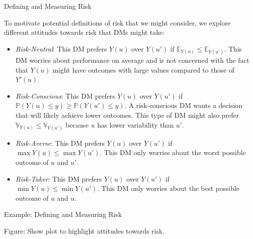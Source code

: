 \documentclass[9pt]{beamer}
\begin{document}
%
\begin{frame}{Defining and Measuring Risk}

To motivate potential definitions of risk that we might consider, we explore different attitudes towards risk that DMs might take: 

\begin{block}{}
\begin{itemize}
\item {\em Risk-Neutral}: This DM prefers $Y(u)$ over $Y(u')$ if $\mathbb{E}_{Y(u)}\leq \mathbb{E}_{Y(u')}$.  This DM worries about performance on average and is not concerned with the fact that $Y(u)$ might have outcomes with large values compared to those of $Y'(u)$. 

\item {\em Risk-Conscious}: This DM prefers $Y(u)$ over $Y(u')$ if $\mathbb{P}(Y(u)\leq y)\geq \mathbb{P}(Y(u')\leq y)$.  A risk-conscious DM wants a decision that will likely achieve lower outcomes. This type of DM might also prefer $\mathbb{V}_{Y(u)}\leq \mathbb{V}_{Y(u')}$ because $u$ has lower variability than $u'$.

\item {\em Risk-Averse}: This DM prefers $Y(u)$ over $Y(u')$ if $\max  Y(u)\leq \max Y(u')$.  This DM only worries about the worst possible outcome of $u$ and $u'$.

\item {\em Risk-Taker}: This DM prefers $Y(u)$ over $Y(u')$ if $\min Y(u)\leq \min Y(u')$.  This DM only worries about the best possible outcome of $u$ and $u$.

\end{itemize}
\end{block}


\end{frame}

%
\begin{frame}{Example: Defining and Measuring Risk}

\begin{block}{}
Figure: Show plot to highlight attitudes towards risk. 
\end{block}

\end{frame}
\end{document}
